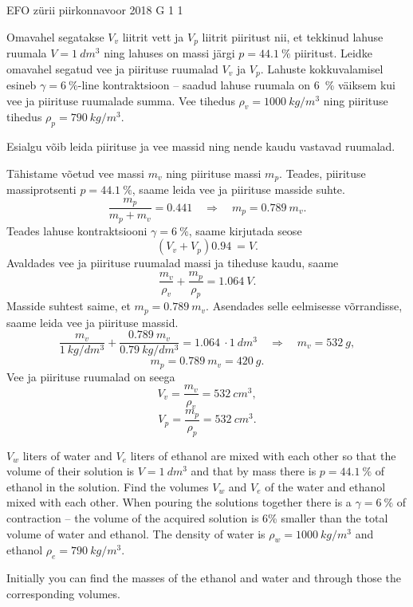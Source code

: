 {EFO zürii} %
{piirkonnavoor} %
{2018} %
{G 1} %
{1} %
{
\ifStatement
Omavahel segatakse $V_v$ liitrit vett ja $V_p$ liitrit piiritust nii, et tekkinud lahuse ruumala $V=\SI{1}{dm^3}$ ning lahuses on massi järgi $p=\SI{44,1}{\percent}$ piiritust. Leidke omavahel segatud vee ja piirituse ruumalad $V_v$ ja $V_p$. Lahuste kokkuvalamisel esineb $\gamma = \SI{6}{\percent}$-line kontraktsioon -- saadud lahuse ruumala on \SI{6}{\percent} väiksem kui vee ja piirituse ruumalade summa. Vee tihedus $\rho_v=\SI{1000}{kg/m^3}$ ning piirituse tihedus $\rho_p=\SI{790}{kg/m^3}$.
\fi


\ifHint
Esialgu võib leida piirituse ja vee massid ning nende kaudu vastavad ruumalad.
\fi


\ifSolution
Tähistame võetud vee massi $m_v$ ning piirituse massi $m_p$. Teades, piirituse massiprotsenti $p = \SI{44,1}{\percent}$, saame leida vee ja piirituse masside suhte.
\[ \frac{m_p}{m_p+m_v}=\SI{0,441}  \quad\Rightarrow\quad m_p=\SI{0,789}{}m_v.\]
Teades lahuse kontraktsiooni $\gamma = \SI{6}{\percent}$, saame kirjutada seose
\[ (V_v + V_p)\SI{0,94}{} = V.\]
Avaldades vee ja piirituse ruumalad massi ja tiheduse kaudu, saame
\[ \frac{m_v}{\rho_v} + \frac{m_p}{\rho_p} = \SI{1,064}{}V.\]
Masside suhtest saime, et $m_p=\SI{0,789}{}m_v$. Asendades selle eelmisesse võrrandisse, saame leida vee ja piirituse massid.
\[ \frac{m_v}{\SI{1}{kg/dm^3}} + \frac{\SI{0,789}{}{m_v}}{\SI{0,79}{kg/dm^3}} = \SI{1,064}{}\cdot\SI{1}{dm^3} \quad\Rightarrow\quad
m_v = \SI{532}{g},\]
\[ m_p = \SI{0,789}{}m_v =  \SI{420}{g}.\]
Vee ja piirituse ruumalad on seega
\[ V_v = \frac{m_v}{\rho_v} = \SI{532}{cm^3},\]
\[ V_p = \frac{m_p}{\rho_p} =  \SI{532}{cm^3}.\]
\fi


\ifEngStatement
$V_w$ liters of water and $V_e$ liters of ethanol are mixed with each other so that the volume of their solution is $V=\SI{1}{dm^3}$ and that by mass there is $p=\SI{44,1}{\percent}$ of ethanol in the solution. Find the volumes $V_w$ and $V_e$ of the water and ethanol mixed with each other. When pouring the solutions together there is a $\gamma = \SI{6}{\percent}$ of contraction – the volume of the acquired solution is 6\% smaller than the total volume of water and ethanol. The density of water is $\rho_w=\SI{1000}{kg/m^3}$ and ethanol $\rho_e=\SI{790}{kg/m^3}$.
\fi


\ifEngHint
Initially you can find the masses of the ethanol and water and through those the corresponding volumes.
\fi


}
